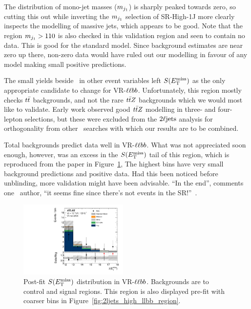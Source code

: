 The distribution of mono-jet masses ($m_{j_1}$) is sharply peaked towards zero,
so cutting this out while inverting the $m_{j_1}$ selection of SR-High-1J
more clearly inspects the modelling of massive jets, which appears to be good.
Note that the region $m_{j_1} > 110$ is also checked in this validation region
and seen to contain no data.
This is good for the standard model.
Since background estimates are near zero up there, non-zero data would have
ruled out our modelling in favour of any model making small positive
predictions.

The small yields beside \srllbb\ in other event variables left $\metsig$ as
the only appropriate candidate to change for VR-$\llbb$.
Unfortunately, this region mostly checks $t\bar t$ backgrounds, and not the
rare $t\bar t Z$ backgrounds which we would most like to validate.
Early work observed good $t\bar t Z$ modelling in three- and four- lepton
selections, but these were excluded from the $2\ell\mathrm{jets}$ analysis for
orthogonality from other \atlas\ searches with which our results are to be
combined.

Total backgrounds predict data well in VR-$\llbb$.
What was not appreciated soon enough, however, was an excess in the $\metsig$
tail of this region, which is reproduced from the paper in
Figure~\ref{fig:2ljets_high_metsig_vrllbb_paper},
The highest bins have very small background predictions and positive data.
Had this been noticed before unblinding, more validation might have
been advisable.
``In the end'', comments one \atlas\ author,
``it seems fine since there's not events in the SR!''~\cite{comment2022vrllbb}.

\begin{figure}[tp]
\centering
\includegraphics[width=0.48\textwidth]{figures/2ljets_vr_llbb_met_sig.pdf}
\caption[
Post-fit $\metsig$ distribution in VR-$\llbb$
]{%
Post-fit $\metsig$ distribution in VR-$\llbb$.
Backgrounds are to control and signal regions.
This region is also displayed pre-fit with coarser bins in
Figure~\ref{fig:2ljets_high_llbb_region}.
}
\label{fig:2ljets_high_metsig_vrllbb_paper}
\end{figure}


